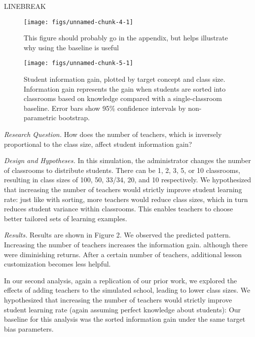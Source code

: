 \documentclass[10pt, letterpaper]{article}
\newenvironment{CodeChunk}{}{}
\begin{document}
LINEBREAK

\begin{CodeChunk}
\begin{figure}[t]
\texttt{[image: figs/unnamed-chunk-4-1]} \caption[This figure should probably go in the appendix, but helps illustrate why using the baseline is useful]{This figure should probably go in the appendix, but helps illustrate why using the baseline is useful}\label{fig:unnamed-chunk-4}
\end{figure}
\end{CodeChunk}

\begin{CodeChunk}
\begin{figure}[t]
\texttt{[image: figs/unnamed-chunk-5-1]} \caption[Student information gain, plotted by target concept and class size]{Student information gain, plotted by target concept and class size. Information gain represents the gain when students are sorted into classrooms based on knowledge compared with a single-classroom baseline. Error bars show 95\% confidence intervals by non-parametric bootstrap.}\label{fig:unnamed-chunk-5}
\end{figure}
\end{CodeChunk}

\emph{Research Question. } How does the number of teachers, which is
inversely proportional to the class size, affect student information
gain?

\emph{Design and Hypotheses. } In this simulation, the administrator
changes the number of classrooms to distribute students. There can be 1,
2, 3, 5, or 10 classrooms, resulting in class sizes of 100, 50, 33/34,
20, and 10 respectively. We hypothesized that increasing the number of
teachers would strictly improve student learning rate: just like with
sorting, more teachers would reduce class sizes, which in turn reduces
student variance within classrooms. This enables teachers to choose
better tailored sets of learning examples.

\emph{Results. } Results are shown in Figure 2. We observed the
predicted pattern. Increasing the number of teachers increases the
information gain. although there were diminishing returns. After a
certain number of teachers, additional lesson customization becomes less
helpful.

In our second analysis, again a replication of our prior work, we
explored the effects of adding teachers to the simulated school, leading
to lower class sizes. We hypothesized that increasing the number of
teachers would strictly improve student learning rate (again assuming
perfect knowledge about students): Our baseline for this analysis was
the sorted information gain under the same target bias parameters.
\end{document}
